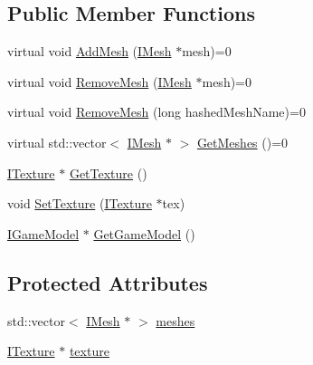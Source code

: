 \subsection*{Public Member Functions}
\begin{DoxyCompactItemize}
\item 
virtual void \hyperlink{class_osiris_i_1_1_graphics_1_1_actors_1_1_i_game_model_aec2c3fa4d85170b69558a40c8ebbe1c7}{Add\-Mesh} (\hyperlink{class_osiris_i_1_1_graphics_1_1_actors_1_1_i_mesh}{I\-Mesh} $\ast$mesh)=0
\item 
virtual void \hyperlink{class_osiris_i_1_1_graphics_1_1_actors_1_1_i_game_model_a01f99f07469d1f6f34e5677922c17b73}{Remove\-Mesh} (\hyperlink{class_osiris_i_1_1_graphics_1_1_actors_1_1_i_mesh}{I\-Mesh} $\ast$mesh)=0
\item 
virtual void \hyperlink{class_osiris_i_1_1_graphics_1_1_actors_1_1_i_game_model_a1de1a9a8aa9a9dcadd75e2ac094708ee}{Remove\-Mesh} (long hashed\-Mesh\-Name)=0
\item 
virtual std\-::vector$<$ \hyperlink{class_osiris_i_1_1_graphics_1_1_actors_1_1_i_mesh}{I\-Mesh} $\ast$ $>$ \hyperlink{class_osiris_i_1_1_graphics_1_1_actors_1_1_i_game_model_a2a3882af78db91dee29c0b6901ea2458}{Get\-Meshes} ()=0
\item 
\hyperlink{class_osiris_i_1_1_graphics_1_1_actors_1_1_i_texture}{I\-Texture} $\ast$ \hyperlink{class_osiris_i_1_1_graphics_1_1_actors_1_1_i_game_model_ae62af3e923f743368b7443c80977b373}{Get\-Texture} ()
\item 
void \hyperlink{class_osiris_i_1_1_graphics_1_1_actors_1_1_i_game_model_a383a1c8cf7818309af4425d94602812d}{Set\-Texture} (\hyperlink{class_osiris_i_1_1_graphics_1_1_actors_1_1_i_texture}{I\-Texture} $\ast$tex)
\item 
\hyperlink{class_osiris_i_1_1_graphics_1_1_actors_1_1_i_game_model}{I\-Game\-Model} $\ast$ \hyperlink{class_osiris_i_1_1_graphics_1_1_actors_1_1_i_game_model_a46dcd7fd8c1bd85903ccd3ffbb113a38}{Get\-Game\-Model} ()
\end{DoxyCompactItemize}
\subsection*{Protected Attributes}
\begin{DoxyCompactItemize}
\item 
std\-::vector$<$ \hyperlink{class_osiris_i_1_1_graphics_1_1_actors_1_1_i_mesh}{I\-Mesh} $\ast$ $>$ \hyperlink{class_osiris_i_1_1_graphics_1_1_actors_1_1_i_game_model_a97095f64ea0a21032f97ff12a830665f}{meshes}
\item 
\hyperlink{class_osiris_i_1_1_graphics_1_1_actors_1_1_i_texture}{I\-Texture} $\ast$ \hyperlink{class_osiris_i_1_1_graphics_1_1_actors_1_1_i_game_model_a2f34baba7ff1843f4457c2955e61c76e}{texture}
\end{DoxyCompactItemize}


